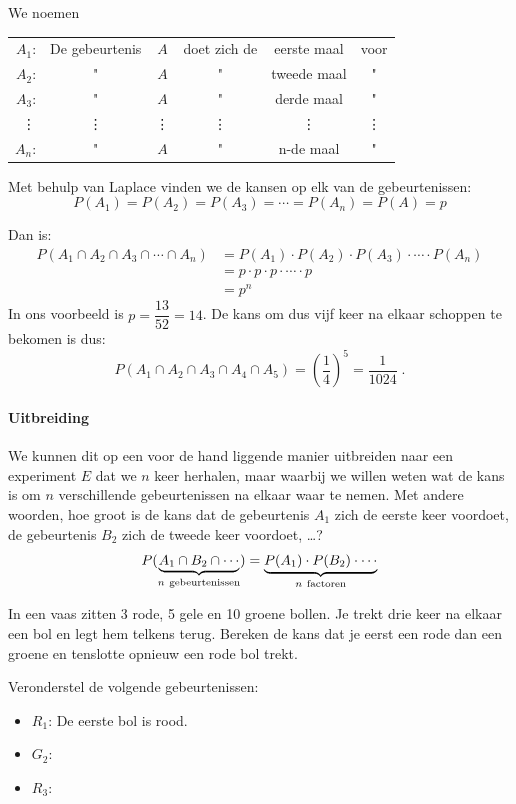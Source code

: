 \documentclass[12pt,twoside]{article}
\begin{document}
We noemen 
\begin{center}
  \renewcommand{\arraystretch}{1}
  \begin{tabular}{r@{ }c@{ }c@{ }c@{ }c@{ }c}
    $A_1$: & De gebeurtenis & $A$ & doet zich de & eerste maal & voor\\
    $A_2$: &        "       & $A$ &       "      & tweede maal &   " \\
    $A_3$: &        "       & $A$ &       "      & derde maal &   " \\
    \vdots &    \vdots      & \vdots &  \vdots   &  \vdots  &\vdots \\
    $A_n$: &        "       & $A$ &       "      & n-de maal &   " \\
  \end{tabular}
\end{center}

Met behulp van Laplace vinden we de kansen op elk van de gebeurtenissen:
$$P(A_1)=P(A_2)=P(A_3)=\cdots=P(A_n)=P(A)=p$$

Dan is:
\begin{align*}
  P(A_1\cap A_2 \cap A_3\cap \cdots \cap A_n)&=P(A_1)\cdot P(A_2)\cdot P(A_3)\cdot \cdots \cdot P(A_n)\\
                                             &=p\cdot p\cdot p\cdot \cdots \cdot p\\
                                             &= p^n
\end{align*}
In ons voorbeeld is $p=\dfrac{13}{52}={1}{4}$. De kans om dus vijf keer na elkaar schoppen te bekomen is dus:
$$P(A_1\cap A_2 \cap A_3\cap A_4 \cap A_5)=\left(\dfrac{1}{4}\right)^5=\dfrac{1}{1024}\;.$$

\paragraph*{Uitbreiding} We kunnen dit op een voor de hand liggende manier uitbreiden naar een experiment $E$ dat we $n$ keer herhalen, maar waarbij we willen weten wat de kans is om $n$ verschillende gebeurtenissen na elkaar waar te nemen. Met andere woorden, hoe groot is de kans dat de gebeurtenis $A_1$ zich de eerste keer voordoet, de gebeurtenis $B_2$ zich de tweede keer voordoet, \ldots?
$$P(\underbrace{A_1\cap B_2\cap\cdots}_{n\mbox{ \scriptsize gebeurtenissen}})=\underbrace{P(A_1)\cdot P(B_2)\cdot \cdots}_{n\mbox{ \scriptsize factoren}}$$

\begin{oefening}
In een vaas zitten 3 rode, 5 gele en 10 groene bollen. Je trekt drie keer na elkaar een bol en legt hem telkens terug. Bereken de kans dat je eerst een rode dan een groene en tenslotte opnieuw een rode bol trekt.

Veronderstel de volgende gebeurtenissen:
\begin{itemize}
  \itemsep0.2em
  \item $R_1$: De eerste bol is rood.
  \item $G_2$: \arulefill
  \item $R_3$: \arulefill
\end{itemize}
\vspace*{0.1cm}
\end{oefening}
\end{document}
